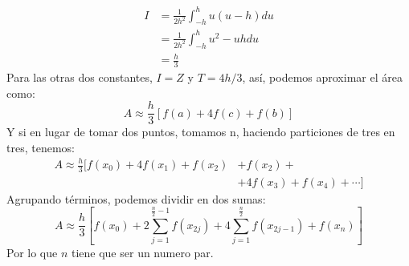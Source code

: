 \documentclass[10pt]{article}
\begin{document}
\begin{multicols}{2}
\begin{equation*}
			\begin{split}
				I&=\frac{1}{2h^2}\int_{-h}^h u(u-h)du\\
				 &=\frac{1}{2h^2}\int_{-h}^h u^2-uh du\\
				 &=\frac{h}{3}
			\end{split}
		\end{equation*}
		Para las otras dos constantes, $I=Z$ y $T=4h/3$, así, podemos aproximar el área como:
		$$A\approx \frac{h}{3}\left[ f(a)+4f(c)+f(b) \right]$$
		Y si en lugar de tomar dos puntos, tomamos n, haciendo particiones de tres en tres, tenemos:
		\begin{equation*}
			\begin{split}
				A\approx \frac{h}{3}[ f(x_0)+4f(x_1)+f(x_2)&+f(x_2)+\\
				&+4f(x_3)+f(x_4)+\cdots]
			\end{split}
		\end{equation*}
		Agrupando términos, podemos dividir en dos sumas:
		$$A\approx \frac {h}{3}\left[f(x_{0})+2\sum _{j=1}^{{\frac {n}{2}}-1}f(x_{2j})+4\sum _{j=1}^{\frac {n}{2}}f(x_{2j-1})+f(x_{n})\right]$$
		Por lo que $n$ tiene que ser un numero par. 
		

\end{multicols}
\end{document}
